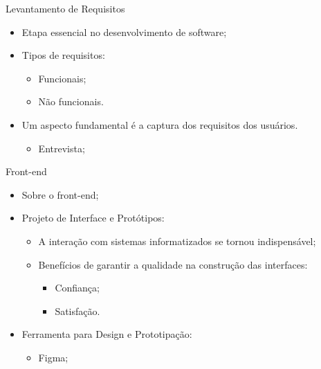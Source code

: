 \begin{frame}{Levantamento de Requisitos}
    \begin{itemize}
        \item Etapa essencial no desenvolvimento de software; \vspace{0.5cm}
        \item Tipos de requisitos: \vspace{0.5cm}
              \begin{itemize}
                  \item Funcionais; \vspace{0.25cm}
                  \item Não funcionais. \vspace{0.5cm}
              \end{itemize}
        \item Um aspecto fundamental é a captura dos requisitos dos usuários. \vspace{0.25cm}
              \begin{itemize}
                  \item Entrevista; \vspace{0.25cm}
              \end{itemize}
    \end{itemize}
\end{frame}

\begin{frame}{Front-end}
    \begin{itemize}
        \item Sobre o front-end; \vspace{0.5cm}
        \item Projeto de Interface e Protótipos: \vspace{0.5cm}
              \begin{itemize}
                  \item A interação com sistemas informatizados se tornou indispensável; \vspace{0.25cm}
                  \item Benefícios de garantir a qualidade na construção das interfaces: \vspace{0.25cm}
                        \begin{itemize}
                            \item Confiança; \vspace{0.25cm}
                            \item Satisfação. \vspace{0.25cm}
                        \end{itemize}
              \end{itemize}
        \item Ferramenta para Design e Prototipação: \vspace{0.5cm}
              \begin{itemize}
                  \item Figma; \vspace{0.25cm}
              \end{itemize}
    \end{itemize}
\end{frame}

